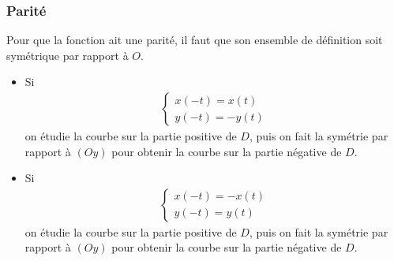 \documentclass{article}
\begin{document}
\subsubsection{Parité}
Pour que la fonction ait une parité, il faut que son ensemble de définition soit
symétrique par rapport à $O$.
\begin{itemize}
                \item Si
\begin{align*}
\left\{%
\begin{array}{l}
        x(-t) = x(t)\\
        y(-t) = -y(t)
\end{array}%
\right.
\end{align*}
on étudie la courbe sur la partie positive de $D$, puis on fait la symétrie par
                rapport à $(Oy)$ pour obtenir la courbe sur la partie négative de $D$.
\begin{center}
\end{center}
        \item Si
\begin{align*}
\left\{%
\begin{array}{l}
        x(-t) = -x(t)\\
        y(-t) = y(t)
\end{array}%
\right.
\end{align*}
on étudie la courbe sur la partie positive de $D$, puis on fait la symétrie par
                rapport à $(Oy)$ pour obtenir la courbe sur la partie négative de $D$.
\begin{center}
\end{center}
\end{itemize}
\end{document}
